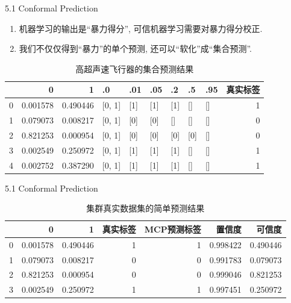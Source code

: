 \documentclass[compress,10pt,dvipsnames,notheorems]{beamer} %
\begin{document}
\begin{frame}{5.1 Conformal Prediction}
\begin{enumerate}
\item 机器学习的输出是“暴力得分”, 可信机器学习需要对暴力得分校正.
\item 我们不仅仅得到“暴力”的单个预测, 还可以“软化”成“集合预测”.
\end{enumerate}

\begin{table}[htbp]
\renewcommand{\arraystretch}{1.3}
\caption{高超声速飞行器的集合预测结果}
\label{tab:set-prediction}
\centering
\begin{tabular}{lrrllllllr}
\toprule
{} &         0 &         1 &     .0 & .01 & .05 &  .2 &  .5 & .95 &  真实标签 \\
\midrule
0 &  0.001578 &  0.490446 &  [0, 1] &  [1] &  [1] &  [1] &   [] &   [] &     1 \\
1 &  0.079073 &  0.008217 &  [0, 1] &  [0] &  [0] &   [] &   [] &   [] &     0 \\
2 &  0.821253 &  0.000954 &  [0, 1] &  [0] &  [0] &  [0] &  [0] &   [] &     0 \\
3 &  0.002549 &  0.250972 &  [0, 1] &  [1] &  [1] &  [1] &   [] &   [] &     1 \\
4 &  0.002752 &  0.387290 &  [0, 1] &  [1] &  [1] &  [1] &   [] &   [] &     1 \\
\bottomrule
\end{tabular}
\end{table}
\end{frame}

\begin{frame}{5.1 Conformal Prediction}
\begin{table}[htbp]
\caption{集群真实数据集的简单预测结果}
\label{tab:simple-prediction}
\centering
\begin{tabular}{lrrrrrr}
\toprule
{} &         0 &         1 &  真实标签 &  MCP预测标签 &     置信度 &     可信度 \\
\midrule
0 &  0.001578 &  0.490446 &     1 &    1 &  0.998422 &  0.490446 \\
1 &  0.079073 &  0.008217 &     0 &    0 &  0.991783 &  0.079073 \\
2 &  0.821253 &  0.000954 &     0 &    0 &  0.999046 &  0.821253 \\
3 &  0.002549 &  0.250972 &     1 &    1 &  0.997451 &  0.250972 \\
\bottomrule
\end{tabular}
\end{table}
\end{frame}
\end{document}
